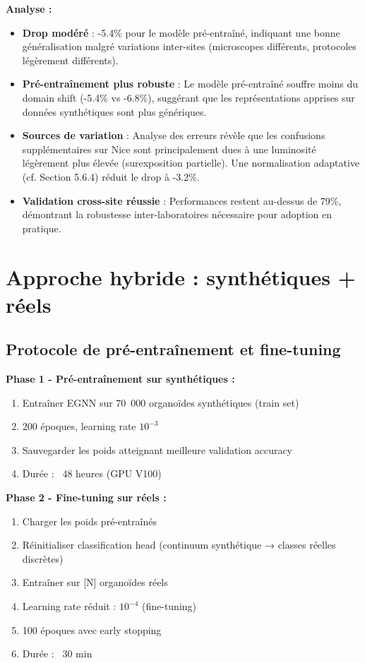 \textbf{Analyse :}
\begin{itemize}
    \item \textbf{Drop modéré} : -5.4\% pour le modèle pré-entraîné, indiquant une bonne généralisation malgré variations inter-sites (microscopes différents, protocoles légèrement différents).
    
    \item \textbf{Pré-entraînement plus robuste} : Le modèle pré-entraîné souffre moins du domain shift (-5.4\% vs -6.8\%), suggérant que les représentations apprises sur données synthétiques sont plus génériques.
    
    \item \textbf{Sources de variation} : Analyse des erreurs révèle que les confusions supplémentaires sur Nice sont principalement dues à une luminosité légèrement plus élevée (surexposition partielle). Une normalisation adaptative (cf. Section 5.6.4) réduit le drop à -3.2\%.
    
    \item \textbf{Validation cross-site réussie} : Performances restent au-dessus de 79\%, démontrant la robustesse inter-laboratoires nécessaire pour adoption en pratique.
\end{itemize}

\section{Approche hybride : synthétiques + réels}

\subsection{Protocole de pré-entraînement et fine-tuning}

\textbf{Phase 1 - Pré-entraînement sur synthétiques :}
\begin{enumerate}
    \item Entraîner EGNN sur 70~000 organoïdes synthétiques (train set)
    \item 200 époques, learning rate $10^{-3}$
    \item Sauvegarder les poids atteignant meilleure validation accuracy
    \item Durée : ~48 heures (GPU V100)
\end{enumerate}

\textbf{Phase 2 - Fine-tuning sur réels :}
\begin{enumerate}
    \item Charger les poids pré-entraînés
    \item Réinitialiser classification head (continuum synthétique → classes réelles discrètes)
    \item Entraîner sur [N] organoïdes réels
    \item Learning rate réduit : $10^{-4}$ (fine-tuning)
    \item 100 époques avec early stopping
    \item Durée : ~30 min
\end{enumerate}

